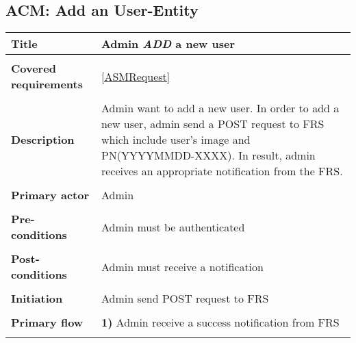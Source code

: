 \documentclass[a4paper,11pt]{article}
\begin{document}
\subsection{ACM: Add an User-Entity}

\begin{tabular}{|p{3.5cm}|p{11.5cm}|} \hline
    \textbf{Title} &   Admin \emph{ADD} a new user
        
    \\ \hline \rowcolor{Gray} & \\ \hline
    
    \textbf{Covered requirements} &  \ref{ASMRequest}
    
    \\ \hline \rowcolor{Gray} & \\ \hline
    
    \textbf{Description} &  Admin want to add a new user. In order to add a new user, admin send a POST request to FRS which include user's image and PN(YYYYMMDD-XXXX). In result, admin receives an appropriate notification from the FRS.
        
    \\ \hline \rowcolor{Gray} & \\ \hline
        
    \textbf{Primary actor} & Admin  
        
    \\ \hline \rowcolor{Gray} & \\ \hline 
          
    \textbf{Pre-conditions} &   Admin must be authenticated
        
    \\ \hline \rowcolor{Gray} & \\ \hline
         
    \textbf{Post-conditions} &   Admin must receive a notification
        
    \\ \hline \rowcolor{Gray} & \\ \hline 
         
    \textbf{Initiation} & Admin send POST request to FRS
        
    \\ \hline \rowcolor{Gray} & \\ \hline 
         
    \textbf{Primary flow} &
    \textbf{1)} Admin receive a success notification from FRS
        
    \\ \hline \rowcolor{Gray} & \\ \hline 
         

\end{tabular}
\end{document}
